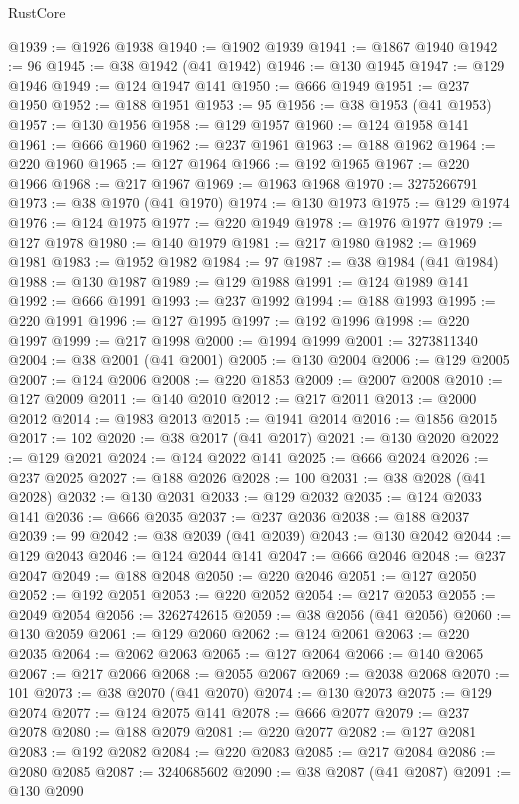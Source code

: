 \begin{lexlean}{RustCore}
\begin{coremodule}
@1939 := @1926 @1938
@1940 := @1902 @1939
@1941 := @1867 @1940
@1942 := 96
@1945 := @38 @1942 (@41 @1942)
@1946 := @130 @1945
@1947 := @129 @1946
@1949 := @124 @1947 @141
@1950 := @666 @1949
@1951 := @237 @1950
@1952 := @188 @1951
@1953 := 95
@1956 := @38 @1953 (@41 @1953)
@1957 := @130 @1956
@1958 := @129 @1957
@1960 := @124 @1958 @141
@1961 := @666 @1960
@1962 := @237 @1961
@1963 := @188 @1962
@1964 := @220 @1960
@1965 := @127 @1964
@1966 := @192 @1965
@1967 := @220 @1966
@1968 := @217 @1967
@1969 := @1963 @1968
@1970 := 3275266791
@1973 := @38 @1970 (@41 @1970)
@1974 := @130 @1973
@1975 := @129 @1974
@1976 := @124 @1975
@1977 := @220 @1949
@1978 := @1976 @1977
@1979 := @127 @1978
@1980 := @140 @1979
@1981 := @217 @1980
@1982 := @1969 @1981
@1983 := @1952 @1982
@1984 := 97
@1987 := @38 @1984 (@41 @1984)
@1988 := @130 @1987
@1989 := @129 @1988
@1991 := @124 @1989 @141
@1992 := @666 @1991
@1993 := @237 @1992
@1994 := @188 @1993
@1995 := @220 @1991
@1996 := @127 @1995
@1997 := @192 @1996
@1998 := @220 @1997
@1999 := @217 @1998
@2000 := @1994 @1999
@2001 := 3273811340
@2004 := @38 @2001 (@41 @2001)
@2005 := @130 @2004
@2006 := @129 @2005
@2007 := @124 @2006
@2008 := @220 @1853
@2009 := @2007 @2008
@2010 := @127 @2009
@2011 := @140 @2010
@2012 := @217 @2011
@2013 := @2000 @2012
@2014 := @1983 @2013
@2015 := @1941 @2014
@2016 := @1856 @2015
@2017 := 102
@2020 := @38 @2017 (@41 @2017)
@2021 := @130 @2020
@2022 := @129 @2021
@2024 := @124 @2022 @141
@2025 := @666 @2024
@2026 := @237 @2025
@2027 := @188 @2026
@2028 := 100
@2031 := @38 @2028 (@41 @2028)
@2032 := @130 @2031
@2033 := @129 @2032
@2035 := @124 @2033 @141
@2036 := @666 @2035
@2037 := @237 @2036
@2038 := @188 @2037
@2039 := 99
@2042 := @38 @2039 (@41 @2039)
@2043 := @130 @2042
@2044 := @129 @2043
@2046 := @124 @2044 @141
@2047 := @666 @2046
@2048 := @237 @2047
@2049 := @188 @2048
@2050 := @220 @2046
@2051 := @127 @2050
@2052 := @192 @2051
@2053 := @220 @2052
@2054 := @217 @2053
@2055 := @2049 @2054
@2056 := 3262742615
@2059 := @38 @2056 (@41 @2056)
@2060 := @130 @2059
@2061 := @129 @2060
@2062 := @124 @2061
@2063 := @220 @2035
@2064 := @2062 @2063
@2065 := @127 @2064
@2066 := @140 @2065
@2067 := @217 @2066
@2068 := @2055 @2067
@2069 := @2038 @2068
@2070 := 101
@2073 := @38 @2070 (@41 @2070)
@2074 := @130 @2073
@2075 := @129 @2074
@2077 := @124 @2075 @141
@2078 := @666 @2077
@2079 := @237 @2078
@2080 := @188 @2079
@2081 := @220 @2077
@2082 := @127 @2081
@2083 := @192 @2082
@2084 := @220 @2083
@2085 := @217 @2084
@2086 := @2080 @2085
@2087 := 3240685602
@2090 := @38 @2087 (@41 @2087)
@2091 := @130 @2090

\end{coremodule}
\end{lexlean}
